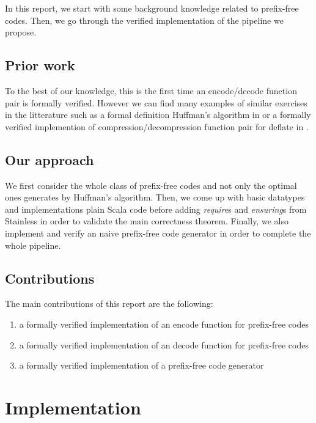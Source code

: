 \documentclass[a4paper,UKenglish,cleveref, autoref, thm-restate]{lipics-v2021}
\begin{document}
In this report, we start with some background knowledge related to prefix-free codes. Then, we go through the verified implementation of the pipeline we propose.

\subsection*{Prior work}

To the best of our knowledge, this is the first time an encode/decode function pair is formally verified.
However we can find many examples of similar exercises in the litterature such as a formal definition Huffman's algorithm in \cite{formal} or a formally verified implemention of compression/decompression function pair for deflate in \cite{deflate}.

\subsection*{Our approach} %

We first consider the whole class of prefix-free codes and not only the optimal ones generates by Huffman's algorithm.
Then, we come up with basic datatypes and implementations plain Scala code before adding  \emph{require}s and \emph{ensuring}s from Stainless in order to validate the main correctness theorem.
Finally, we also implement and verify an naive prefix-free code generator in order to complete the whole pipeline.

\subsection*{Contributions} %

The main contributions of this report are the following:
\begin{enumerate}
    \item a formally verified implementation of an encode function for prefix-free codes
    \item a formally verified implementation of an decode function for prefix-free codes
    \item a formally verified implementation of a prefix-free code generator
\end{enumerate}

\section{Implementation}
\end{document}
